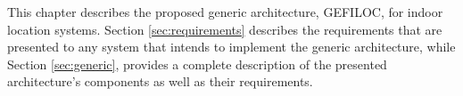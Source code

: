 \label{cap:architecture}

This chapter describes the proposed generic architecture, GEFILOC, for indoor location systems. Section \ref{sec:requirements} describes the requirements that are presented to any system that intends to implement the generic architecture, while Section \ref{sec:generic}, provides a complete description of the presented architecture's components as well as their requirements.



\cleardoublepage
